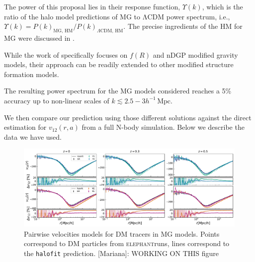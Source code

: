 \documentclass[%
 reprint,
groupedaddress,
nofootinbib,
nobibnotes,
 amsmath,amssymb,
 aps,
]{revtex4-2}
\newcommand{\code}[1]{{\texttt{#1}}}
\newcommand{\pairvel}{$v_{12}(r,a)$}
\newcommand{\lcdm}{$\mathrm{\Lambda CDM}$}
\newcommand{\Mpch}{$h^{-1}\,\mbox{Mpc}$}
\newcommand{\elephant}{\textsc{elephant}}
\newcommand{\<}{\langle}
\renewcommand{\>}{\rangle}
\newcommand{\MJ}[1]{\textcolor{WildStrawberry}{[Mariana]: #1}}
\begin{document}
The power of this proposal lies in their response function, $\Upsilon(k)$, which is the ratio of the halo model predictions of MG to \lcdm{} power spectrum, i.e.,  $\Upsilon(k) = P(k)_{\text{MG, HM}}/P(k)_{\Lambda\text{CDM, HM}}$. The precise ingredients of the HM for MG were discussed in  \cite{2023PhRvD.107h3525G}. 

While the work of   \cite{2023PhRvD.107h3525G}  specifically focuses on $f(R)$ and nDGP modified gravity models, their  approach can be readily extended to other modified structure formation models.

The resulting power spectrum for the MG models considered reaches a 5\% accuracy up to non-linear scales of $k \lesssim 2.5-3$\Mpch. 

We then compare our prediction using those different solutions against the direct estimation for \pairvel{}  from a full N-body simulation. 
Below we describe the data we have used. 

\begin{figure}
\includegraphics[width=\textwidth]{figs/fig2_v12datamodelMG_all.pdf}
\caption{\label{fig:v12_model_comparisonMG} Pairwise velocities models for DM tracers in MG models. Points correspond to DM particles from \elephant runs, lines correspond to the \code{halofit} prediction. \MJ{WORKING ON THIS figure} }
\end{figure}
\end{document}
